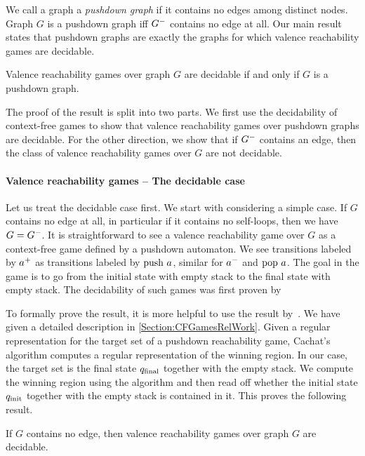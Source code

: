 \documentclass[../../diss.tex]{subfiles}
\begin{document}
We call a graph a \emph{pushdown graph} if it contains no edges among distinct nodes.
Graph $G$ is a pushdown graph iff ${G}^{-}$ contains no edge at all.
Our main result states that pushdown graphs are exactly the graphs for which valence reachability games are decidable.

\begin{theorem}%
\label{Theorem:ValenceReachabilityGamesClassification}%
    Valence reachability games over graph $G$ are decidable if and only if $G$ is a pushdown graph.
\end{theorem}

The proof of the result is split into two parts.
We first use the decidability of context-free games to show that valence reachability games over pushdown graphs are decidable.
For the other direction, we show that if ${G}^{-}$ contains an edge, then the class of valence reachability games over $G$ are not decidable.

\paragraph{Valence reachability games -- The decidable case}

Let us treat the decidable case first.
We start with considering a simple case.
If $G$ contains no edge at all, in particular if it contains no self-loops, then we have $G = {G}^{-}$.
It is straightforward to see a valence reachability game over $G$ as a context-free game defined by a pushdown automaton.
We see transitions labeled by ${a}^+$ as transitions labeled by $\text{push}~ a$, similar for ${a}^-$ and $\text{pop}~ a$.
The goal in the game is to go from the initial state with empty stack to the final state with empty stack.
The decidability of such games was first proven by~

To formally prove the result, it is more helpful to use the result by~.
We have given a detailed description in \cref{Section:CFGamesRelWork}.
Given a regular representation for the target set of a pushdown reachability game, Cachat's algorithm computes a regular representation of the winning region.
In our case, the target set is the final state $q_{\text{final}}$ together with the empty stack.
We compute the winning region using the algorithm and then read off whether the initial state $q_{\text{init}}$ together with the empty stack is contained in it.
This proves the following result.

\begin{lemma}%
\label{Lemma:ValenceReachabilityGamesDecidableNoEdges}%
    If $G$ contains no edge, then valence reachability games over graph $G$ are decidable.
\end{lemma}
\end{document}
